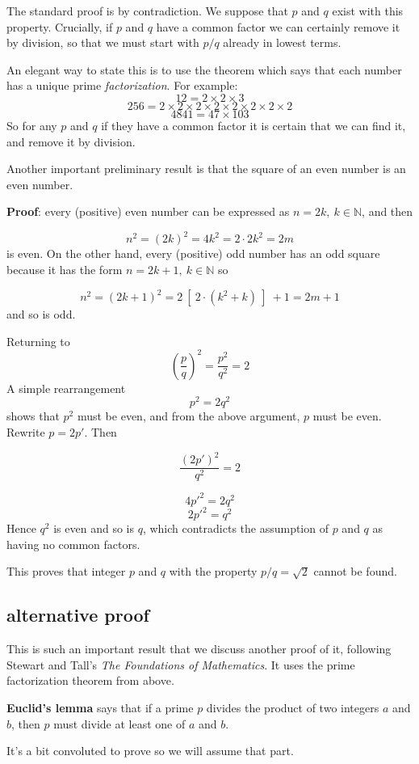 \documentclass[11pt, oneside]{article}
\begin{document}
The standard proof is by contradiction.  We suppose that $p$ and $q$ exist with this property.  Crucially, if $p$ and $q$ have a common factor we can certainly remove it by division, so that we must start with $p/q$ already in lowest terms.

An elegant way to state this is to use the theorem which says that each number has a unique prime \emph{factorization}.  For example:
\[ 12 = 2 \times 2 \times 3 \]
\[ 256 = 2 \times 2 \times 2 \times 2 \times 2 \times 2 \times 2 \times 2 \]
\[ 4841 = 47 \times 103 \]
So for any $p$ and $q$ if they have a common factor it is certain that we can find it, and remove it by division.

Another important preliminary result is that the square of an even number is an even number.

\textbf{Proof}:  every (positive) even number can be expressed as $n = 2k, \ k \in \mathbb{N}$, and then

\[ n^2 = (2k)^2 = 4k^2 = 2 \cdot 2 k^2 = 2m \]
is even.  On the other hand, every (positive) odd number has an odd square because it has the form $n = 2k + 1, \ k \in \mathbb{N}$ so

\[ n^2 = (2k + 1)^2 = 2 \ [ \ 2 \cdot (k^2 + k) \ ] \  + 1 = 2m + 1 \]
and so is odd.

Returning to
\[ (\frac{p}{q})^2 = \frac{p^2}{q^2} = 2 \]
A simple rearrangement 
\[ p^2 = 2 q^2 \]
shows that $p^2$ must be even, and from the above argument, $p$ must be even.  Rewrite $p = 2p'$.  Then

\[ \frac{(2p')^2}{q^2} = 2 \]

\[ 4 p'^2 = 2 q^2 \]
\[ 2 p'^2 = q^2 \]
Hence $q^2$ is even and so is $q$, which contradicts the assumption of $p$ and $q$ as having no common factors.  

This proves that integer $p$ and $q$ with the property $p/q = \sqrt{2}$ cannot be found.

\subsection*{alternative proof}
This is such an important result that we discuss another proof of it, following Stewart and Tall's \emph{The Foundations of Mathematics}.  It uses the prime factorization theorem from above.  

\textbf{Euclid's lemma} says that if a prime $p$ divides the product of two integers $a$ and $b$, then $p$ must divide at least one of $a$ and $b$.

It's a bit convoluted to prove so we will assume that part.  
\end{document}
